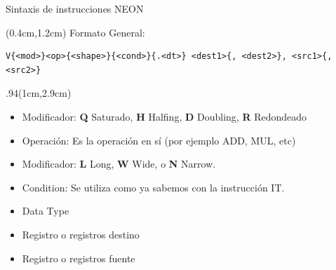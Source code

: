 \begin{frame}[fragile]{Sintaxis de instrucciones NEON}
 \begin{textblock*}{\textwidth}(0.4cm,1.2cm) 
  Formato General:
  \begin{lstlisting}[basicstyle=\scriptsize,numbers=none, escapechar=\@]
  V{<mod>}<op>{<shape>}{<cond>}{.<dt>} <dest1>{, <dest2>}, <src1>{, <src2>}
  \end{lstlisting}
 \end{textblock*}
 \begin{textblock*}{.94\textwidth}(1cm,2.9cm) 
  \begin{itemize} \justifying
   \item [\textit{mod}] Modificador: \textbf{Q} Saturado, \textbf{H} Halfing, \textbf{D} Doubling, \textbf{R} Redondeado
   \item [\textit{op}] Operación: Es la operación en sí (por ejemplo ADD, MUL, etc)
   \item [\textit{shape}] Modificador: \textbf{L} Long, \textbf{W} Wide, o \textbf{N} Narrow.
   \item [\textit{cond}] Condition: Se utiliza como ya sabemos con la instrucción IT.
   \item [\textit{dt}] Data Type
   \item [\textit{dest\textsubscript{n}}] Registro o registros destino
   \item [\textit{src\textsubscript{n}}] Registro o registros fuente
  \end{itemize}
 \end{textblock*}
\end{frame}

